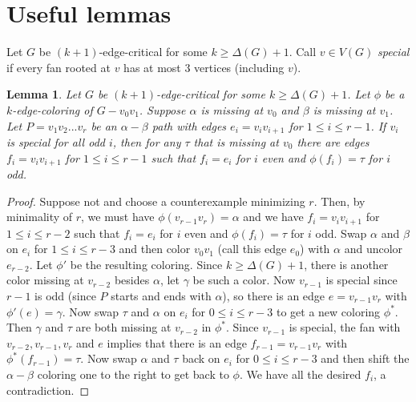 \documentclass[12pt]{amsart}
\theoremstyle{plain}
\newtheorem{lem}[thm]{Lemma}
\theoremstyle{definition}
\theoremstyle{remark}
\begin{document}
\section{Useful lemmas}
Let $G$ be $(k+1)$-edge-critical for some $k \ge \Delta(G) + 1$.  Call $v \in
V(G)$ \emph{special} if every fan rooted at $v$ has at most 3 vertices
(including $v$).

\setcounter{thm}{-1}
\begin{lem}\label{SpecialPath}
Let $G$ be $(k+1)$-edge-critical for some $k \ge \Delta(G) + 1$.  Let $\phi$ be a
$k$-edge-coloring of $G-v_0v_1$.  Suppose $\alpha$ is missing at $v_0$ and
$\beta$ is missing at $v_1$.  Let $P = v_1v_2...v_r$ be an $\alpha-\beta$ path
with edges $e_i = v_iv_{i+1}$ for $1 \le i \le r-1$.  If $v_i$ is special for
all odd $i$, then for any $\tau$ that is missing at $v_0$ there are edges $f_i =
v_iv_{i+1}$ for $1 \le i \le r-1$ such that $f_i = e_i$ for $i$ even and
$\phi(f_i) = \tau$ for $i$ odd.
\end{lem}
\begin{proof}
Suppose not and choose a counterexample minimizing $r$.  Then, by minimality of
$r$, we must have $\phi(v_{r-1}v_r) = \alpha$ and we have $f_i = v_iv_{i+1}$ for
$1 \le i \le r-2$ such that $f_i = e_i$ for $i$ even and $\phi(f_i) = \tau$ for
$i$ odd.  Swap $\alpha$ and $\beta$ on $e_i$ for $1 \le i \le r-3$ and then
color $v_0v_1$ (call this edge $e_0$) with $\alpha$ and uncolor $e_{r-2}$.  Let
$\phi'$ be the resulting coloring.  Since $k \ge \Delta(G) + 1$, there is
another color missing at $v_{r-2}$ besides $\alpha$, let $\gamma$ be such a color.  Now 
$v_{r-1}$ is special since $r-1$ is odd (since $P$ starts and ends with
$\alpha$), so there is an edge $e = v_{r-1}v_r$ with $\phi'(e) = \gamma$.  Now
swap $\tau$ and $\alpha$ on $e_i$ for $0 \le i \le r-3$ to get a new coloring
$\phi^*$.  Then $\gamma$ and $\tau$ are both missing at $v_{r-2}$ in $\phi^*$.
Since $v_{r-1}$ is special, the fan with $v_{r-2}, v_{r-1}, v_r$ and $e$
implies that there is an edge $f_{r-1} = v_{r-1}v_r$ with $\phi^*(f_{r-1}) =
\tau$.  Now swap $\alpha$ and $\tau$ back on $e_i$ for $0 \le i \le r-3$ and
then shift the $\alpha-\beta$ coloring one to the right to get back to $\phi$. 
We have all the desired $f_i$, a contradiction.
\end{proof}
\end{document}

